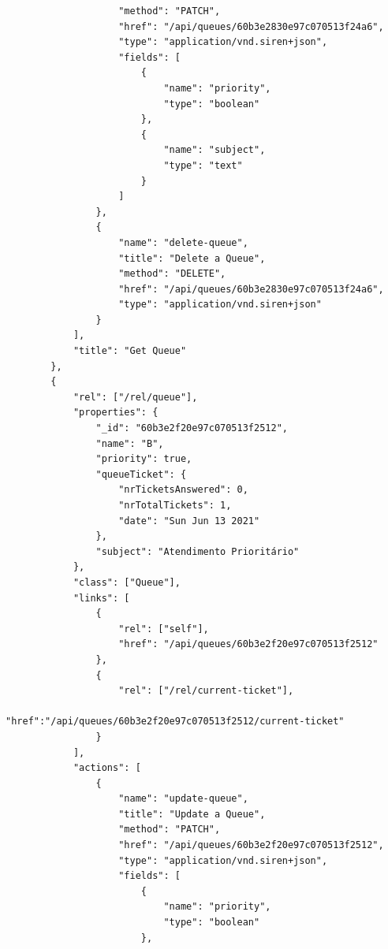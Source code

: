 \documentclass[12pt,a4paper]{article}
\begin{document}
\begin{verbatim}
                    "method": "PATCH",
                    "href": "/api/queues/60b3e2830e97c070513f24a6",
                    "type": "application/vnd.siren+json",
                    "fields": [                             
                        {
                            "name": "priority",                               
                            "type": "boolean"                            
                        },                             
                        {
                            "name": "subject",                                
                            "type": "text"                             
                        }                         
                    ]                     
                },
                {
                    "name": "delete-queue",
                    "title": "Delete a Queue",
                    "method": "DELETE",
                    "href": "/api/queues/60b3e2830e97c070513f24a6",
                    "type": "application/vnd.siren+json"                     
                }                 
            ],
            "title": "Get Queue"
        },
        {
            "rel": ["/rel/queue"],
            "properties": {
                "_id": "60b3e2f20e97c070513f2512",
                "name": "B",
                "priority": true,
                "queueTicket": {
                    "nrTicketsAnswered": 0,                         
                    "nrTotalTickets": 1,
                    "date": "Sun Jun 13 2021"                     
                },
                "subject": "Atendimento Prioritário"
            },
            "class": ["Queue"],                 
            "links": [
                {
                    "rel": ["self"],
                    "href": "/api/queues/60b3e2f20e97c070513f2512"          
                },                     
                {                         
                    "rel": ["/rel/current-ticket"],                       
                    "href":"/api/queues/60b3e2f20e97c070513f2512/current-ticket"
                }                 
            ],
            "actions": [
                {
                    "name": "update-queue",
                    "title": "Update a Queue",
                    "method": "PATCH",
                    "href": "/api/queues/60b3e2f20e97c070513f2512",
                    "type": "application/vnd.siren+json",
                    "fields": [                             
                        {
                            "name": "priority",
                            "type": "boolean"
                        },              

\end{verbatim}
\end{document}
